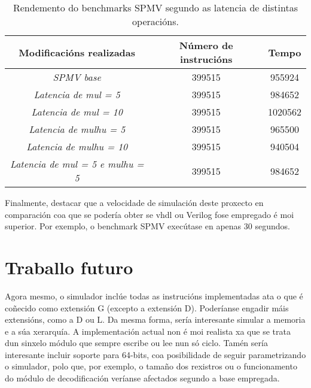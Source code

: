 \begin{table}[hp!]
    \centering
    \begin{tabular}{c|c|c}
    \rowcolor{udcpink!25}
    \textbf{Modificacións realizadas} & \textbf{Número de instrucións}  & \textbf{Tempo} 
    \\\hline
    \textit{SPMV base} & 399515 & 955924 \\
    \textit{Latencia de mul = 5} & 399515 & 984652\\
    \textit{Latencia de mul = 10} & 399515 & 1020562\\
     \textit{Latencia de mulhu = 5} & 399515 & 965500\\ 
    \textit{Latencia de mulhu = 10} & 399515 & 940504\\ %
    \textit{Latencia de mul = 5 e mulhu = 5} & 399515 & 984652\\
    \end{tabular}
    \caption{Rendemento do benchmarks SPMV segundo as latencia de distintas operacións.}
    \label{tab:rendemento_spmv}
\end{table}

Finalmente, destacar que a velocidade de simulación deste proxecto en comparación coa que se podería obter se \acrshort{vhdl} ou Verilog fose empregado é moi superior. Por exemplo, o benchmark SPMV execútase en apenas 30 segundos.

\section{Traballo futuro}\label{chap:traballo_futuro}
Agora mesmo, o simulador inclúe todas as instrucións implementadas ata o que é coñecido como extensión G (excepto a extensión D). Poderíanse engadir máis extensións, como a D ou L. Da mesma forma, sería interesante simular a memoria e a súa xerarquía. A implementación actual non é moi realista xa que se trata dun sinxelo módulo que sempre escribe ou lee nun só ciclo. Tamén sería interesante incluir soporte para 64-bits, coa posibilidade de seguir parametrizando o simulador, polo que, por exemplo, o tamaño dos rexistros ou o funcionamento do módulo de decodificación veríanse afectados segundo a base empregada.


